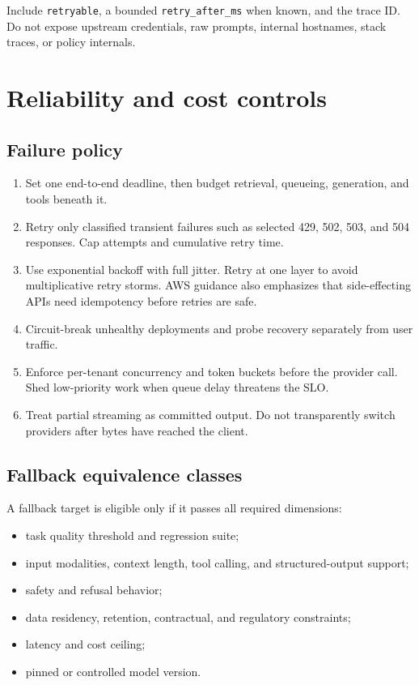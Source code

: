 \documentclass[10pt]{article}
\newcommand{\code}[1]{\texttt{#1}}
\begin{document}
Include \code{retryable}, a bounded \code{retry\_after\_ms} when known, and the trace ID. Do not expose upstream credentials, raw prompts, internal hostnames, stack traces, or policy internals.

\section{Reliability and cost controls}

\subsection{Failure policy}

\begin{enumerate}
  \item Set one end-to-end deadline, then budget retrieval, queueing, generation, and tools beneath it.
  \item Retry only classified transient failures such as selected 429, 502, 503, and 504 responses. Cap attempts and cumulative retry time.
  \item Use exponential backoff with full jitter. Retry at one layer to avoid multiplicative retry storms. AWS guidance also emphasizes that side-effecting APIs need idempotency before retries are safe.\cite{aws-retries}
  \item Circuit-break unhealthy deployments and probe recovery separately from user traffic.
  \item Enforce per-tenant concurrency and token buckets before the provider call. Shed low-priority work when queue delay threatens the SLO.
  \item Treat partial streaming as committed output. Do not transparently switch providers after bytes have reached the client.
\end{enumerate}

\subsection{Fallback equivalence classes}

A fallback target is eligible only if it passes all required dimensions:

\begin{itemize}
  \item task quality threshold and regression suite;
  \item input modalities, context length, tool calling, and structured-output support;
  \item safety and refusal behavior;
  \item data residency, retention, contractual, and regulatory constraints;
  \item latency and cost ceiling;
  \item pinned or controlled model version.
\end{itemize}
\end{document}
